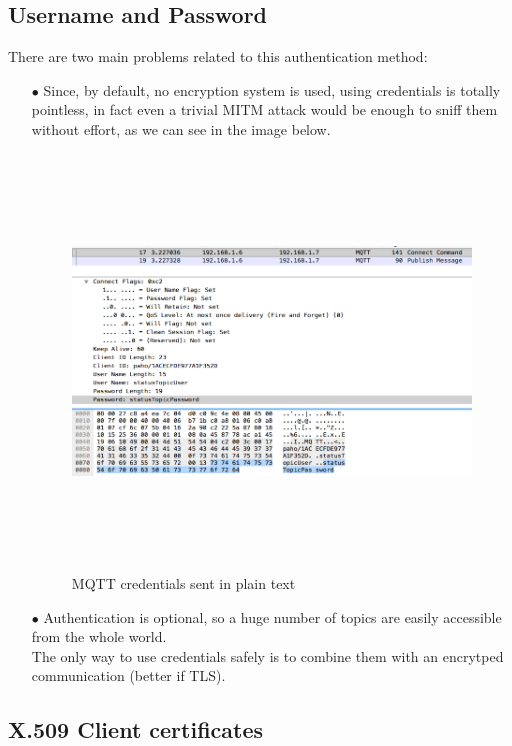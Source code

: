 \documentclass[12pt]{report}
\begin{document}
{\subsection{Username and Password}
\bigskip
There are two main problems related to this authentication method:

\begin{itemize}
\setlength{\itemindent}{+4mm}
  \item[$\bullet$] Since, by default, no encryption system is used, using credentials is totally pointless, in fact even a trivial MITM attack would be enough to sniff them without effort, as we can see in the image below.

\begin{figure}[H]
\includegraphics[width=11cm,height=11cm,keepaspectratio]{wireshark_credentials}
\centering
\caption{MQTT credentials sent in plain text}
\end{figure}

\item[$\bullet$] Authentication is optional, so a huge number of topics are easily accessible from the whole world.\\

The only way to use credentials safely is to combine them with an encrytped communication (better if TLS).

\end{itemize}

\subsection{X.509 Client certificates}
\bigskip

}
\end{document}
